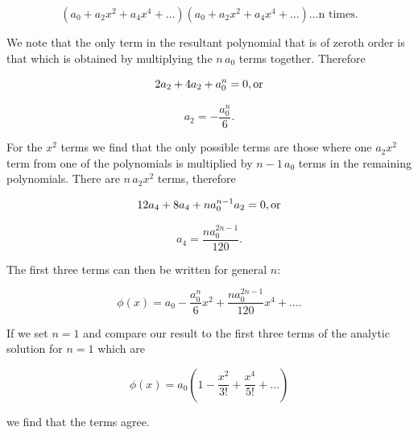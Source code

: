 \documentclass[12pt, manuscript]{article}
\begin{document}
\begin{equation}
\left( a_0 + a_2x^2 + a_4x^4 + \dots \right) \left( a_0 + a_2x^2 + a_4x^4 + \dots \right) \dots \text{n times}.
\end{equation}

\noindent We note that the only term in the resultant polynomial that is of zeroth order is that which is obtained by multiplying the $n\,a_0$ terms together. Therefore

\begin{equation}
2a_2 + 4a_2 + a_0^n = 0, \text{or} \notag
\end{equation}

\begin{equation}
a_2 = -\frac{a_0^n}{6}.
\end{equation}

\noindent For the $x^2$ terms we find that the only possible terms are those where one $a_2x^2$ term from one of the polynomials is multiplied by $n-1\,a_0$ terms in the remaining polynomials. There are $n\,a_2x^2$ terms, therefore

\begin{equation}
12a_4 + 8a_4 + na_0^{n-1}a_2 = 0, \text{or} \notag
\end{equation}

\begin{equation}
a_4 = \frac{na_0^{2n-1}}{120}.
\end{equation}

\noindent The first three terms can then be written for general $n$:

\begin{equation}
\phi \left( x \right) = a_0 - \frac{a_0^n}{6}x^2 + \frac{na_0^{2n-1}}{120}x^4 + \dots.
\end{equation}

\noindent If we set $n=1$ and compare our result to the first three terms of the analytic solution for $n=1$ which are

\begin{equation}
\phi \left( x \right) = a_0 \left(1 - \frac{x^2}{3!} + \frac{x^4}{5!} + \dots \right)
\end{equation}

\noindent we find that the terms agree.
\end{document}
